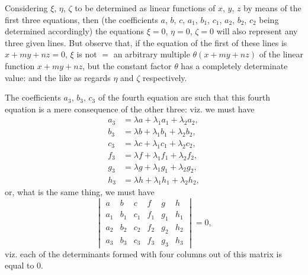 \documentclass[11pt,a4paper]{article}
\theoremstyle{plain}
\theoremstyle{definition}
\theoremstyle{remark}
\begin{document}
\medskip


\medskip

Considering $\xi$, $\eta$, $\zeta$ to be determined as linear functions of $x$, $y$, $z$ by means of the first three equations, then (the coefficients $a$, $b$, $c$, $a_1$, $b_1$, $c_1$, $a_2$, $b_2$, $c_2$ being determined accordingly) the equations $\xi = 0$, $\eta = 0$, $\zeta = 0$ will also represent any three given lines. But observe that, if the equation of the first of these lines is $x + my + nz = 0$, $\xi$ is not $=$ an arbitrary multiple $\theta(x + my + nz)$ of the linear function $x + my + nz$, but the constant factor $\theta$ has a completely determinate value: and the like as regards $\eta$ and $\zeta$ respectively.

The coefficients $a_3$, $b_3$, $c_3$ of the fourth equation are such that this fourth equation is a mere consequence of the other three: viz. we must have
\begin{align*}
a_3 &= \lambda a + \lambda_1 a_1 + \lambda_2 a_2,\\
b_3 &= \lambda b + \lambda_1 b_1 + \lambda_2 b_2,\\
c_3 &= \lambda c + \lambda_1 c_1 + \lambda_2 c_2,\\
f_3 &= \lambda f + \lambda_1 f_1 + \lambda_2 f_2,\\
g_3 &= \lambda g + \lambda_1 g_1 + \lambda_2 g_2,\\
h_3 &= \lambda h + \lambda_1 h_1 + \lambda_2 h_2,
\end{align*}
or, what is the same thing, we must have
\[
\begin{vmatrix}
a & b & c & f & g & h \\
a_1 & b_1 & c_1 & f_1 & g_1 & h_1 \\
a_2 & b_2 & c_2 & f_2 & g_2 & h_2 \\
a_3 & b_3 & c_3 & f_3 & g_3 & h_3
\end{vmatrix} = 0,
\]
viz. each of the determinants formed with four columns out of this matrix is equal to 0.
\end{document}
